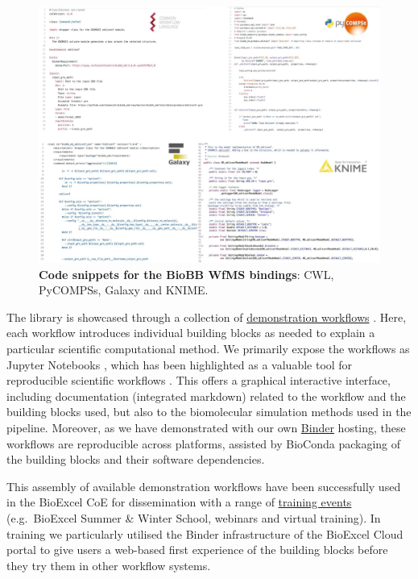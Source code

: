 \begin{figure}%
  \includegraphics[width=\textwidth]{figures/ch06/figure1.jpg}
	\caption[Code snippets for the BioBB
  WfMS bindings]{\textbf{Code snippets for the BioBB
  WfMS bindings}: CWL, PyCOMPSs, Galaxy and KNIME.}
  \label{ch6:figure1}
\end{figure}

The library is showcased through a collection of
\href{http://mmb.irbbarcelona.org/biobb/workflows}{demonstration
workflows} \cite{ch6-12}. Here, each workflow introduces individual building
blocks as needed to explain a particular scientific computational
method. We primarily expose the workflows as Jupyter Notebooks \cite{Kluyver 2016},
which has been highlighted as a valuable tool for reproducible
scientific workflows \cite{ch6-14}. This offers a graphical interactive
interface, including documentation (integrated markdown) related to the
workflow and the building blocks used, but also to the biomolecular
simulation methods used in the pipeline. Moreover, as we have
demonstrated with our own
\href{https://hub-bioexcel-binder.tsi.ebi.ac.uk/}{Binder} \cite{ch6-15}
hosting, these workflows are reproducible across platforms, assisted by
BioConda \cite{Gruning 2018a} packaging of the building blocks and their software
dependencies.

This assembly of available demonstration workflows have been
successfully used in the BioExcel CoE for dissemination with a range of
\href{https://mmb.irbbarcelona.org/biobb/about/training}{training
events} (e.g.~BioExcel Summer \& Winter School, webinars and virtual
training). In training we particularly utilised the Binder
infrastructure of the BioExcel Cloud portal \cite{ch6-17} to give users a
web-based first experience of the building blocks before they try them
in other workflow systems.

